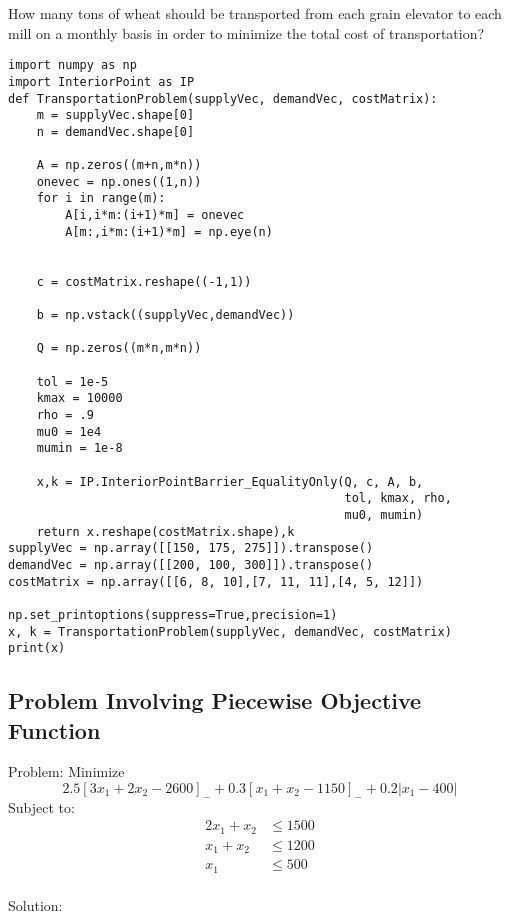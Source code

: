 \documentclass[11pt]{article}
\begin{document}
How many tons of wheat should be transported from each grain elevator to each mill on a monthly basis in order to minimize the total cost of transportation? 

\begin{verbatim}
import numpy as np
import InteriorPoint as IP
def TransportationProblem(supplyVec, demandVec, costMatrix):
    m = supplyVec.shape[0]
    n = demandVec.shape[0]

    A = np.zeros((m+n,m*n))
    onevec = np.ones((1,n))
    for i in range(m):
        A[i,i*m:(i+1)*m] = onevec
        A[m:,i*m:(i+1)*m] = np.eye(n)


    c = costMatrix.reshape((-1,1))

    b = np.vstack((supplyVec,demandVec))

    Q = np.zeros((m*n,m*n))

    tol = 1e-5
    kmax = 10000
    rho = .9
    mu0 = 1e4
    mumin = 1e-8

    x,k = IP.InteriorPointBarrier_EqualityOnly(Q, c, A, b, 
                                               tol, kmax, rho, 
                                               mu0, mumin)
    return x.reshape(costMatrix.shape),k
supplyVec = np.array([[150, 175, 275]]).transpose()
demandVec = np.array([[200, 100, 300]]).transpose()
costMatrix = np.array([[6, 8, 10],[7, 11, 11],[4, 5, 12]])

np.set_printoptions(suppress=True,precision=1)
x, k = TransportationProblem(supplyVec, demandVec, costMatrix)
print(x)
\end{verbatim}
\subsection{Problem Involving Piecewise Objective Function}
\label{sec:org554ba9a}
Problem:
Minimize
\begin{equation*}
  2.5 \left[3x_1 + 2x_2 - 2600\right]_- + 0.3 \left[x_1 + x_2 - 1150\right]_- + 0.2 \lvert x_1 - 400 \rvert
\end{equation*}
Subject to: 
\begin{align*}
  2x_1 + x_2 &\leq 1500 \\
   x_1 + x_2 &\leq 1200 \\
   x_1       &\leq  500 \\
\end{align*}

Solution:
\end{document}
